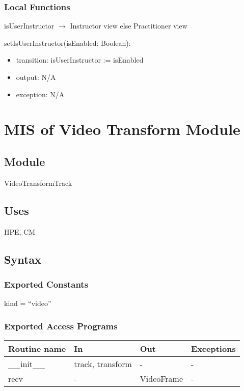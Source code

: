 \documentclass[12pt, titlepage]{article}
\begin{document}
\subsubsection{Local Functions}

\noindent isUserInstructor $\rightarrow$ Instructor view else Practitioner view

\noindent setIsUserInstructor(isEnabled: Boolean):
\begin{itemize}
  \item transition: isUserInstructor := isEnabled
  \item output: N/A
  \item exception: N/A
\end{itemize}

\section{MIS of Video Transform Module}
\label{sec:videotransform}

\subsection{Module}
VideoTransformTrack

\subsection{Uses}
HPE, CM

\subsection{Syntax}

\subsubsection{Exported Constants}
kind = ``video''

\subsubsection{Exported Access Programs}
\begin{table}[h!]
  \centering
  \begin{tabular}{llll}
    \toprule
    \textbf{Routine name} & \textbf{In}             & \textbf{Out}        & \textbf{Exceptions} \\
    \midrule
    \_\_init\_\_          & track, transform        & -                   & -                   \\
    recv                  & -                       & VideoFrame          & -                   \\
    \bottomrule
  \end{tabular}
\end{table}
\end{document}
